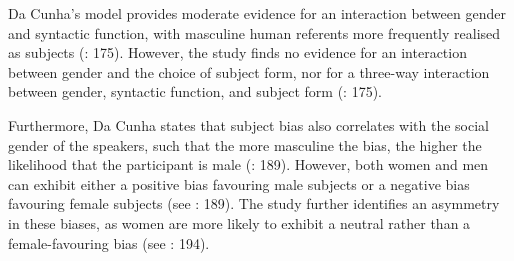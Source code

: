\documentclass[
  letterpaper,
  DIV=11,
  numbers=noendperiod]{scrartcl}
\begin{document}
Da Cunha's model provides moderate evidence for an interaction between
gender and syntactic function, with masculine human referents more
frequently realised as subjects (: 175).
However, the study finds no evidence for an interaction between gender
and the choice of subject form, nor for a three-way interaction between
gender, syntactic function, and subject form
(: 175).

Furthermore, Da Cunha states that subject bias also correlates with the
social gender of the speakers, such that the more masculine the bias,
the higher the likelihood that the participant is male
(: 189). However, both women and men can
exhibit either a positive bias favouring male subjects or a negative
bias favouring female subjects (see : 189). The study further identifies an asymmetry in these biases,
as women are more likely to exhibit a neutral rather than a
female-favouring bias (see :
194).
\end{document}
